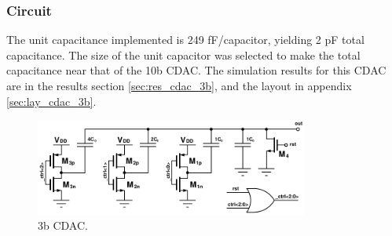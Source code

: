 		\subsubsection{Circuit}
		The unit capacitance implemented is 249 fF/capacitor, yielding 2 pF total capacitance. The size of the unit capacitor was selected to make the total capacitance near that of the 10b CDAC. The simulation results for this CDAC are in the results section \ref{sec:res_cdac_3b}, and the layout in appendix \ref{sec:lay_cdac_3b}.
			\begin{figure}[htb!]
			        \centering
			        \includegraphics[width=0.8\textwidth, angle=0]{./figs/design/cdac_3b}
			    \caption{3b CDAC.}
			    \label{fig:3b_cdac_cir}
			\end{figure}

	\FloatBarrier
